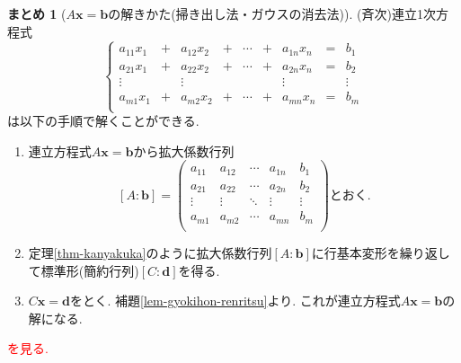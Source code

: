 \documentclass[dvipdfmx,a4paper,11pt]{article} %
\newcommand{\xr}[1]{\textcolor{red}{#1}}
\theoremstyle{definition}
\newtheorem{suma}[thm]{まとめ}
\begin{document}
\begin{tcolorbox}[
    colback = white,
    colframe = green!35!black,
    fonttitle = \bfseries,
    breakable = true]
        \begin{suma}[$A\bm{x} =\bm{b}$の解きかた(掃き出し法・ガウスの消去法)]
\label{suma-gauss}
(斉次)連立1次方程式
\begin{equation*}
\left\{ 
\begin{matrix}
a_{11}x_1&+& a_{12} x_2& +&\cdots &+&a_{1n}x_n &= &b_1\\
a_{21}x_1&+& a_{22} x_2& +&\cdots &+&a_{2n}x_n &= &b_2 \\
\vdots		&& 	\vdots				 && 		& &\vdots&&\vdots	\\
a_{m1}x_1&+& a_{m2} x_2& +&\cdots &+&a_{mn}x_n &= &b_m \\
\end{matrix}
\right.
\end{equation*}
は以下の手順で解くことができる. 
     \begin{enumerate}
    \setlength{\parskip}{0cm} 
  \setlength{\itemsep}{0cm}
 \item  連立方程式$A\bm{x} =\bm{b}$から拡大係数行列
 $$
 [A:\bm{b}]=\begin{pmatrix}
a_{11}& a_{12} & \cdots &a_{1n} &b_1\\
a_{21}& a_{22} & \cdots &a_{2n} &b_2\\
\vdots& \vdots	&	\ddots   &	\vdots &\vdots\\
a_{m1}& a_{m2} & \cdots &a_{mn} &b_m\\
\end{pmatrix}
\text{とおく.}
 $$
 \item 定理\ref{thm-kanyakuka}のように拡大係数行列$[A:\bm{b}]$に行基本変形を繰り返して標準形(簡約行列)$[C:\bm{d}]$を得る.
 \item $C \bm{x}=\bm{d}$をとく. 補題\ref{lem-gyokihon-renritsu}より. これが連立方程式$A\bm{x} =\bm{b}$の解になる. 
 \end{enumerate}
\end{suma}
 \end{tcolorbox}
   \xr{\cite[例 2.4.5]{O}を見る.}
\end{document}
